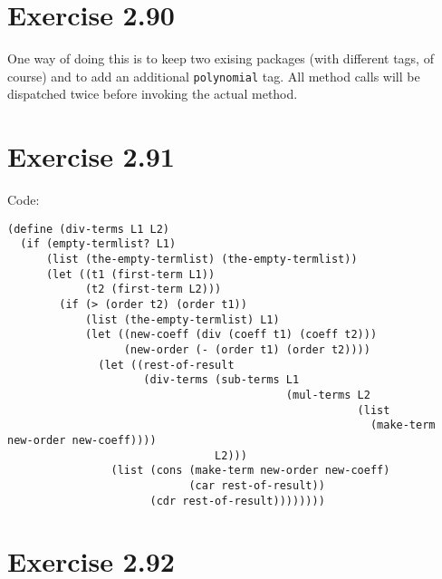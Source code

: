 \documentclass[../main.tex]{subfiles}
\begin{document}
\section{Exercise 2.90}

One way of doing this is to keep two exising packages
 (with different tags, of course) and to
 add an additional \lstinline{polynomial} tag.
 All method calls will be dispatched twice before
 invoking the actual method.

\section{Exercise 2.91}

Code:

\begin{lstlisting}
(define (div-terms L1 L2)
  (if (empty-termlist? L1)
      (list (the-empty-termlist) (the-empty-termlist))
      (let ((t1 (first-term L1))
            (t2 (first-term L2)))
        (if (> (order t2) (order t1))
            (list (the-empty-termlist) L1)
            (let ((new-coeff (div (coeff t1) (coeff t2)))
                  (new-order (- (order t1) (order t2))))
              (let ((rest-of-result
                     (div-terms (sub-terms L1
                                           (mul-terms L2
                                                      (list
                                                        (make-term new-order new-coeff))))
                                L2)))
                (list (cons (make-term new-order new-coeff)
                            (car rest-of-result))
                      (cdr rest-of-result))))))))
\end{lstlisting}

\section{Exercise 2.92}
\end{document}
